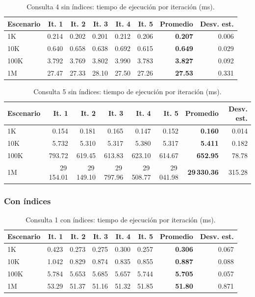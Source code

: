 \documentclass[11pt,letterpaper]{article}
\begin{document}
\begin{table}[H]
\centering\small
\begin{tabular}{lrrrrrrr}
\toprule
Escenario & It. 1 & It. 2 & It. 3 & It. 4 & It. 5 & Promedio & Desv. est. \\
\midrule
1K & 0.214 & 0.202 & 0.201 & 0.212 & 0.206 & \textbf{0.207} & 0.006 \\
10K & 0.640 & 0.658 & 0.638 & 0.692 & 0.615 & \textbf{0.649} & 0.029 \\
100K & 3.792 & 3.769 & 3.802 & 3.990 & 3.783 & \textbf{3.827} & 0.092 \\
1M & 27.47 & 27.33 & 28.10 & 27.50 & 27.26 & \textbf{27.53} & 0.331 \\
\bottomrule
\end{tabular}
\caption{Consulta 4 sin índices: tiempo de ejecución por iteración (ms).}\label{tab:sin4}
\end{table}

\begin{table}[H]
\centering\small
\begin{tabular}{lrrrrrrr}
\toprule
Escenario & It. 1 & It. 2 & It. 3 & It. 4 & It. 5 & Promedio & Desv. est. \\
\midrule
1K & 0.154 & 0.181 & 0.165 & 0.147 & 0.152 & \textbf{0.160} & 0.014 \\
10K & 5.732 & 5.310 & 5.317 & 5.380 & 5.317 & \textbf{5.411} & 0.182 \\
100K & 793.72 & 619.45 & 613.83 & 623.10 & 614.67 & \textbf{652.95} & 78.78 \\
1M & 29\,154.01 & 29\,149.10 & 29\,797.96 & 29\,508.77 & 29\,041.98 & \textbf{29\,330.36} & 315.28 \\
\bottomrule
\end{tabular}
\caption{Consulta 5 sin índices: tiempo de ejecución por iteración (ms).}\label{tab:sin5}
\end{table}


\subsubsection{Con índices}

\begin{table}[H]
\centering\small
\begin{tabular}{lrrrrrrr}
\toprule
Escenario & It. 1 & It. 2 & It. 3 & It. 4 & It. 5 & Promedio & Desv. est. \\
\midrule
1K & 0.423 & 0.273 & 0.275 & 0.300 & 0.257 & \textbf{0.306} & 0.067 \\
10K & 1.042 & 0.829 & 0.874 & 0.835 & 0.855 & \textbf{0.887} & 0.088 \\
100K & 5.784 & 5.653 & 5.685 & 5.657 & 5.744 & \textbf{5.705} & 0.057 \\
1M & 53.29 & 51.37 & 51.16 & 51.32 & 51.85 & \textbf{51.80} & 0.871 \\
\bottomrule
\end{tabular}
\caption{Consulta 1 con índices: tiempo de ejecución por iteración (ms).}\label{tab:con1}
\end{table}
\end{document}
